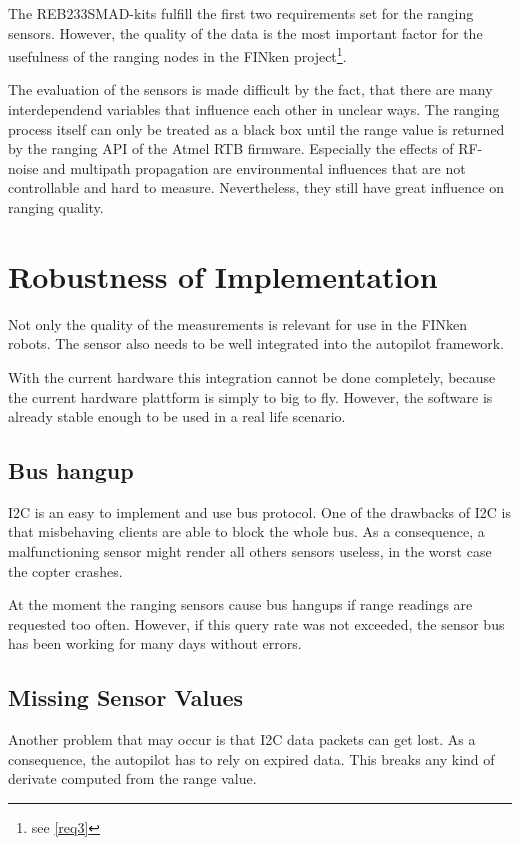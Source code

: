 The REB233SMAD-kits fulfill the first two requirements set for the ranging sensors.
However, the quality of the data is the most important factor for the usefulness of the ranging nodes in the FINken project\footnote{see \autoref{req3}}.

The evaluation of the sensors is made difficult by the fact, that there are many interdependend variables that influence each other in unclear ways.
The ranging process itself can only be treated as a black box until the range value is returned by the ranging API of the Atmel RTB firmware.
Especially the effects of RF-noise and multipath propagation are environmental influences that are not controllable and hard to measure.
Nevertheless, they still have great influence on ranging quality.

\section{Robustness of Implementation}

Not only the quality of the measurements is relevant for use in the FINken robots. 
The sensor also needs to be well integrated into the autopilot framework.

With the current hardware this integration cannot be done completely, because the current hardware plattform is simply to big to fly.
However, the software is already stable enough to be used in a real life scenario.


\subsection{Bus hangup}
I2C is an easy to implement and use bus protocol.
One of the drawbacks of I2C is that misbehaving clients are able to block the whole bus.
As a consequence, a malfunctioning sensor might render all others sensors useless, in the worst case the copter crashes.

At the moment the ranging sensors cause bus hangups if range readings are requested too often.
However, if this query rate was not exceeded, the sensor bus has been working for many days without errors.

\subsection{Missing Sensor Values}
Another problem that may occur is that I2C data packets can get lost.
As a consequence, the autopilot has to rely on expired data.
This breaks any kind of derivate computed from the range value.

